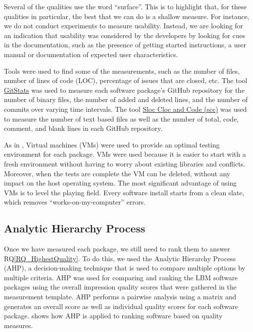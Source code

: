 \documentclass[final, 3p, times, authoryear]{elsarticle}
\newcommand{\rqref}[1]{RQ\ref{#1}}
\begin{document}
Several of the qualities use the word ``surface''.  This is to highlight that,
for these qualities in particular, the best that we can do is a shallow measure.
For instance, we do not conduct experiments to measure usability. Instead, we
are looking for an indication that usability was considered by the developers by
looking for cues in the documentation, such as the presence of getting started
instructions, a user manual or documentation of expected user characteristics.

Tools were used to find some of the measurements, such as the number of files,
number of lines of code (LOC), percentage of issues that are closed, etc. The
tool \href{https://github.com/tomgi/git_stats}{GitStats} was used to measure
each software package's GitHub repository for the number of binary files, the
number of added and deleted lines, and the number of commits over varying time
intervals. The tool \href{https://github.com/boyter/scc}{Sloc Cloc and Code
(scc)} was used to measure the number of text based files as well as the number
of total, code, comment, and blank lines in each GitHub repository.

As in \citet{SmithEtAl2016}, Virtual machines (VMs) were used to provide an
optimal testing environment for each package. VMs were used because it is
easier to start with a fresh environment without having to worry about existing
libraries and conflicts. Moreover, when the tests are complete the VM can be
deleted, without any impact on the host operating system. The most significant
advantage of using VMs is to level the playing field. Every software install
starts from a clean slate, which removes ``works-on-my-computer'' errors.

\subsection{Analytic Hierarchy Process} \label{AHP}

Once we have measured each package, we still need to rank them to answer
\rqref{RQ_HighestQuality}.  To do this, we used the Analytic Hierarchy Process
(AHP), a decision-making technique that is used to compare multiple options by
multiple criteria. AHP was used for comparing and ranking the LBM software
packages using the overall impression quality scores that were gathered in the
measurement template.  AHP performs a pairwise analysis using a matrix and
generates an overall score as well as individual quality scores for each
software package. \citep{SmithEtAl2016} shows how AHP is applied to ranking
software based on quality measures. 
\end{document}

